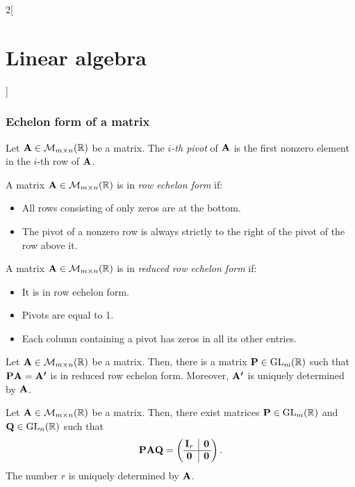 \documentclass[../../../main.tex]{subfiles}
\begin{document}
\begin{multicols}{2}[\section{Linear algebra}]
  \subsubsection{Echelon form of a matrix}
  \begin{definition}
    Let $\boldsymbol{\mathrm{A}}\in\mathcal{M}_{m\times n}(\mathbb{R})$ be a matrix. The \emph{$i$-th pivot} of $\boldsymbol{\mathrm{A}}$ is the first nonzero element in the $i$-th row of $\boldsymbol{\mathrm{A}}$.
  \end{definition}
  \begin{definition}
    A matrix $\boldsymbol{\mathrm{A}}\in\mathcal{M}_{m\times n}(\mathbb{R})$ is in \emph{row echelon form} if:
    \begin{itemize}
      \item All rows consisting of only zeros are at the bottom.
      \item The pivot of a nonzero row is always strictly to the right of the pivot of the row above it.
    \end{itemize}
  \end{definition}
  \begin{definition}
    A matrix $\boldsymbol{\mathrm{A}}\in\mathcal{M}_{m\times n}(\mathbb{R})$ is in \emph{reduced row echelon form} if:
    \begin{itemize}
      \item It is in row echelon form.
      \item Pivots are equal to 1.
      \item Each column containing a pivot has zeros in all its other entries.
    \end{itemize}
  \end{definition}
  \begin{theorem}
    Let $\boldsymbol{\mathrm{A}}\in\mathcal{M}_{m\times n}(\mathbb{R})$ be a matrix. Then, there is a matrix $\boldsymbol{\mathrm{P}}\in\mathrm{GL}_m(\mathbb{R})$ such that $\boldsymbol{\mathrm{P}}\boldsymbol{\mathrm{A}}=\boldsymbol{\mathrm{A'}}$ is in reduced row echelon form. Moreover, $\boldsymbol{\mathrm{A'}}$ is uniquely determined by $\boldsymbol{\mathrm{A}}$.
  \end{theorem}
  \begin{theorem}
    Let $\boldsymbol{\mathrm{A}}\in\mathcal{M}_{m\times n}(\mathbb{R})$ be a matrix. Then, there exist matrices $\boldsymbol{\mathrm{P}}\in\mathrm{GL}_m(\mathbb{R})$ and $\boldsymbol{\mathrm{Q}}\in\mathrm{GL}_n(\mathbb{R})$ such that
    $$\vf{P}\vf{A}\vf{Q}=\left(
      \begin{array}{@{\,} c|c @{\,}}
          \vf{I}_r & \vf{0} \\
          \hline
          \vf{0}   & \vf{0}
        \end{array}
      \right).$$
    The number $r$ is uniquely determined by $\boldsymbol{\mathrm{A}}$.
  \end{theorem}

\end{multicols}
\end{document}
